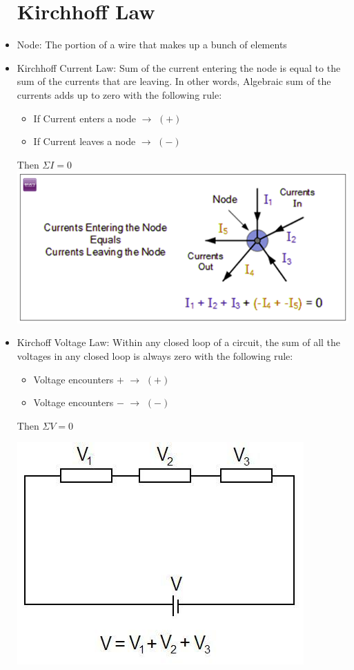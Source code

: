 \documentclass[twoside]{article}
\begin{document}
\begin{itemize}
	\newpage
	\section{Kirchhoff Law}
	\item Node: The portion of a wire that makes up a bunch of elements
	\item Kirchhoff Current Law: Sum of the current entering the node is equal to the sum of the currents that are leaving. In other words, Algebraic sum of the currents adds up to zero with the following rule:
	\begin{itemize}
	\item If Current enters a node $\rightarrow$ $(+) $
	\item If Current leaves a node $\rightarrow$ $(-) $
	\end{itemize}
	\hspace{3cm}Then $\Sigma I = 0$
	\newline
	\includegraphics[scale=0.75]{currentlaw}
	\item Kirchoff Voltage Law: Within any closed loop of a circuit, the sum of all the voltages in any closed loop is always zero with the following rule:
	\begin{itemize}
	\item Voltage encounters $+$ $\rightarrow$ $(+) $
	\item Voltage encounters $-$ $\rightarrow$ $(-) $
	\end{itemize}
	\hspace{3cm}Then $\Sigma V = 0$
	
	\includegraphics[scale=0.70]{voltagelaw}


\end{itemize}
\end{document}
